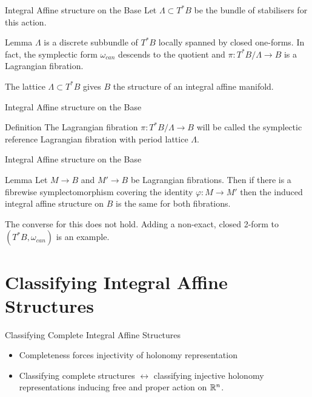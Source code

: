 \begin{frame}[c]{Integral Affine structure on the Base}
	Let $\Lambda \subset T^*B$ be the bundle of stabilisers for this action.
	\begin{kulblock}{Lemma}
		$\Lambda$ is a discrete subbundle of $T^*B$ locally spanned by closed one-forms. In fact, the symplectic
		form $\omega_{can}$ descends to the quotient and $\pi :T^*B/\Lambda \to B$ is a Lagrangian fibration.
	\end{kulblock}
	\begin{remark}
		The lattice $\Lambda \subset T^*B$ gives $B$ the structure of an integral affine manifold.
	\end{remark}
\end{frame}

\begin{frame}[c]{Integral Affine structure on the Base}
	\begin{kulblock}{Definition}
		The Lagrangian fibration $\pi :T^*B/\Lambda \to B$ will be called the symplectic reference Lagrangian fibration with period lattice $\Lambda$.
	\end{kulblock}
\end{frame}

\begin{frame}[c]{Integral Affine structure on the Base}
	\begin{kulblock}{Lemma}
		Let $M \to B$ and $M' \to B$ be Lagrangian fibrations. Then if there is a fibrewise symplectomorphism
		covering the identity $\varphi: M \to M'$ then the induced integral affine structure on $B$ is the same for both fibrations.
	\end{kulblock}

	\begin{remark}
		The converse for this does not hold. Adding a non-exact, closed 2-form to $(T^*B, \omega_{can})$ is an example.
	\end{remark}
\end{frame}

\section{Classifying Integral Affine Structures}
\frame[c]{\sectionpage}
\begin{frame}[c]{Classifying Complete Integral Affine Structures}
	\begin{itemize}
		\item Completeness forces injectivity of holonomy representation
		\item Classifying complete structures $\longleftrightarrow$ classifying injective
		      holonomy representations inducing free and proper action on $\mathbb{R}^n$.
	\end{itemize}
\end{frame}

